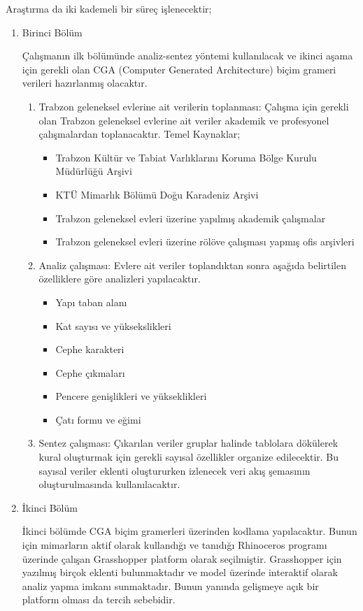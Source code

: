 \documentclass[12pt,turkish,a4paperpaper,]{report}
\providecommand{\tightlist}{%
  \setlength{\itemsep}{0pt}\setlength{\parskip}{0pt}}
\begin{document}
Araştırma da iki kademeli bir süreç işlenecektir;

\begin{enumerate}
\def\labelenumi{\arabic{enumi}.}
\item
  Birinci Bölüm

  Çalışmanın ilk bölümünde analiz-sentez yöntemi kullanılacak ve ikinci
  aşama için gerekli olan CGA (Computer Generated Architecture) biçim
  grameri verileri hazırlanmış olacaktır.

  \begin{enumerate}
  \def\labelenumii{\arabic{enumii}.}
  \item
    Trabzon geleneksel evlerine ait verilerin toplanması: Çalışma için
    gerekli olan Trabzon geleneksel evlerine ait veriler akademik ve
    profesyonel çalışmalardan toplanacaktır. Temel Kaynaklar;

    \begin{itemize}
    \tightlist
    \item
      Trabzon Kültür ve Tabiat Varlıklarını Koruma Bölge Kurulu
      Müdürlüğü Arşivi
    \item
      KTÜ Mimarlık Bölümü Doğu Karadeniz Arşivi
    \item
      Trabzon geleneksel evleri üzerine yapılmış akademik çalışmalar
    \item
      Trabzon geleneksel evleri üzerine rölöve çalışması yapmış ofis
      arşivleri
    \end{itemize}
  \item
    Analiz çalışması: Evlere ait veriler toplandıktan sonra aşağıda
    belirtilen özelliklere göre analizleri yapılacaktır.

    \begin{itemize}
    \item
      Yapı taban alanı
    \item
      Kat sayısı ve yüksekslikleri
    \item
      Cephe karakteri
    \item
      Cephe çıkmaları
    \item
      Pencere genişlikleri ve yükseklikleri
    \item
      Çatı formu ve eğimi
    \end{itemize}
  \item
    Sentez çalışması: Çıkarılan veriler gruplar halinde tablolara
    dökülerek kural oluşturmak için gerekli sayısal özellikler organize
    edilecektir. Bu sayısal veriler eklenti oluştururken izlenecek veri
    akış şemasının oluşturulmasında kullanılacaktır.
  \end{enumerate}
\item
  İkinci Bölüm

  İkinci bölümde CGA biçim gramerleri üzerinden kodlama yapılacaktır.
  Bunun için mimarların aktif olarak kullandığı ve tanıdığı Rhinoceros
  programı üzerinde çalışan Grasshopper platform olarak seçilmiştir.
  Grasshopper için yazılmış birçok eklenti bulunmaktadır ve model
  üzerinde interaktif olarak analiz yapma imkanı sunmaktadır. Bunun
  yanında gelişmeye açık bir platform olması da tercih sebebidir.
\end{enumerate}
\end{document}
